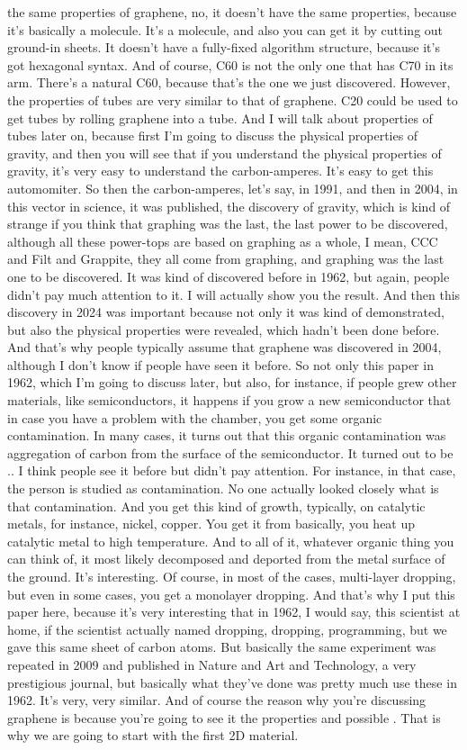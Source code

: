 the same properties of graphene, no, it doesn't have the same properties, because it's basically a molecule. It's a molecule, and also you can get it by cutting out ground-in sheets. It doesn't have a fully-fixed algorithm structure, because it's got hexagonal syntax. And of course, C60 is not the only one that has C70 in its arm. There's a natural C60, because that's the one we just discovered. However, the properties of tubes are very similar to that of graphene. C20 could be used to get tubes by rolling graphene into a tube. And I will talk about properties of tubes later on, because first I'm going to discuss the physical properties of gravity, and then you will see that if you understand the physical properties of gravity, it's very easy to understand the carbon-amperes. It's easy to get this automomiter. So then the carbon-amperes, let's say, in 1991, and then in 2004, in this vector in science, it was published, the discovery of gravity, which is kind of strange if you think that graphing was the last, the last power to be discovered, although all these power-tops are based on graphing as a whole, I mean, CCC and Filt and Grappite, they all come from graphing, and graphing was the last one to be discovered. It was kind of discovered before in 1962, but again, people didn't pay much attention to it. I will actually show you the result. And then this discovery in 2024 was important because not only it was kind of demonstrated, but also the physical properties were revealed, which hadn't been done before. And that's why people typically assume that graphene was discovered in 2004, although I don't know if people have seen it before. So not only this paper in 1962, which I'm going to discuss later, but also, for instance, if people grew other materials, like semiconductors, it happens if you grow a new semiconductor that in case you have a problem with the chamber, you get some organic contamination. In many cases, it turns out that this organic contamination was aggregation of carbon from the surface of the semiconductor. It turned out to be .. I think people see it before but didn't pay attention. For instance, in that case, the person is studied as contamination. No one actually looked closely what is that contamination. And you get this kind of growth, typically, on catalytic metals, for instance, nickel, copper. You get it from basically, you heat up catalytic metal to high temperature. And to all of it, whatever organic thing you can think of, it most likely decomposed and deported from the metal surface of the ground. It's interesting. Of course, in most of the cases, multi-layer dropping, but even in some cases, you get a monolayer dropping. And that's why I put this paper here, because it's very interesting that in 1962, I would say, this scientist at home, if the scientist actually named dropping, dropping, programming, but we gave this same sheet of carbon atoms. But basically the same experiment was repeated in 2009 and published in Nature and Art and Technology, a very prestigious journal, but basically what they've done was pretty much use these in 1962. It's very, very similar. And of course the reason why you're discussing graphene is because you're going to see it the properties and possible . That is why we are going to start with the first 2D material.
